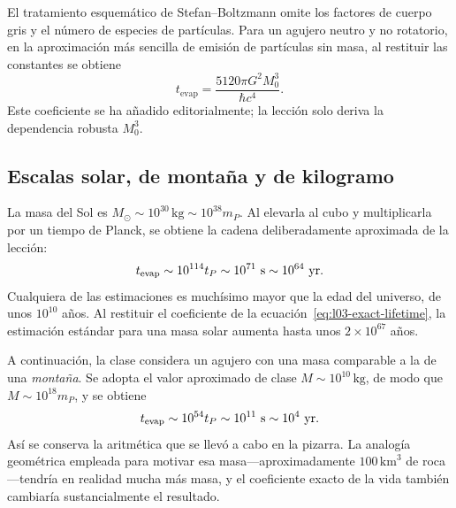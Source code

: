El tratamiento esquemático de Stefan--Boltzmann omite los factores de cuerpo gris y el número de especies de partículas. Para un agujero neutro y no rotatorio, en la aproximación más sencilla de emisión de partículas sin masa, al restituir las constantes se obtiene
\begin{equation}
t_{\mathrm{evap}}
=\frac{5120\pi G^2M_0^3}{\hbar c^4}.
\label{eq:l03-exact-lifetime}
\end{equation}
Este coeficiente se ha añadido editorialmente; la lección solo deriva la dependencia robusta \(M_0^3\).

\subsection{Escalas solar, de montaña y de kilogramo}

La masa del Sol es \(M_\odot\sim10^{30}\,\mathrm{kg}\sim10^{38}m_P\). Al elevarla al cubo y multiplicarla por un tiempo de Planck, se obtiene la cadena deliberadamente aproximada de la lección:
\begin{equation}
t_{\mathrm{evap}}\sim10^{114}t_P
\sim10^{71}\ {\rm s}
\sim10^{64}\ {\rm yr}.
\end{equation}
Cualquiera de las estimaciones es muchísimo mayor que la edad del universo, de unos \(10^{10}\) años. Al restituir el coeficiente de la ecuación~\eqref{eq:l03-exact-lifetime}, la estimación estándar para una masa solar aumenta hasta unos \(2\times10^{67}\) años.

A continuación, la clase considera un agujero con una masa comparable a la de una \emph{montaña}. Se adopta el valor aproximado de clase \(M\sim10^{10}\,\mathrm{kg}\), de modo que \(M\sim10^{18}m_P\), y se obtiene
\begin{equation}
t_{\mathrm{evap}}\sim10^{54}t_P
\sim10^{11}\ {\rm s}
\sim10^4\ {\rm yr}.
\end{equation}
Así se conserva la aritmética que se llevó a cabo en la pizarra. La analogía geométrica empleada para motivar esa masa---aproximadamente \(100\,\mathrm{km}^3\) de roca---tendría en realidad mucha más masa, y el coeficiente exacto de la vida también cambiaría sustancialmente el resultado.

